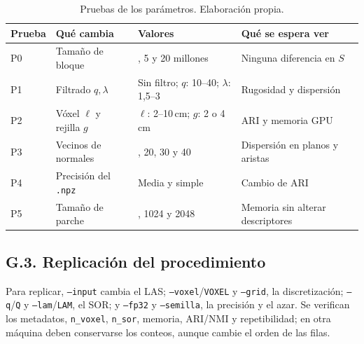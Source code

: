 \begin{table}[H]
\centering
{}
\caption[Pruebas de los parámetros]{Pruebas de los parámetros. Elaboración propia.}
\label{tab:pruebas}
\begin{tabularx}{\linewidth}{@{}l>{\raggedright\arraybackslash\hsize=0.9\hsize}X>{\raggedright\arraybackslash\hsize=0.9\hsize}X>{\raggedright\arraybackslash\hsize=1.2\hsize}X@{}}
\toprule
\textbf{Prueba} & \textbf{Qué cambia} & \textbf{Valores} & \textbf{Qué se espera ver} \\
\midrule
P0 & Tamaño de bloque & 1, 5 y 20 millones & Ninguna diferencia en $S$ \\
P1 & Filtrado $q,\lambda$ & Sin filtro; $q$: 10--40; $\lambda$: 1,5--3 & Rugosidad y dispersión \\
P2 & Vóxel $\ell$ y rejilla $g$ & $\ell$: 2--10\,cm; $g$: 2 o 4\,cm & ARI y memoria GPU \\
P3 & Vecinos de normales & 10, 20, 30 y 40 & Dispersión en planos y aristas \\
P4 & Precisión del \texttt{.npz} & Media y simple & Cambio de ARI \\
P5 & Tamaño de parche & 512, 1024 y 2048 & Memoria sin alterar descriptores \\
\bottomrule
\end{tabularx}
\end{table}


\subsection*{G.3. Replicación del procedimiento}
Para replicar, \texttt{--input} cambia el LAS; \texttt{--voxel}/\texttt{VOXEL}
y \texttt{--grid}, la discretización; \texttt{--q}/\texttt{Q} y
\texttt{--lam}/\texttt{LAM}, el SOR; y \texttt{--fp32} y \texttt{--semilla},
la precisión y el azar. Se verifican los metadatos, \texttt{n\_voxel},
\texttt{n\_sor}, memoria, ARI/NMI y repetibilidad; en otra máquina deben
conservarse los conteos, aunque cambie el orden de las filas.

